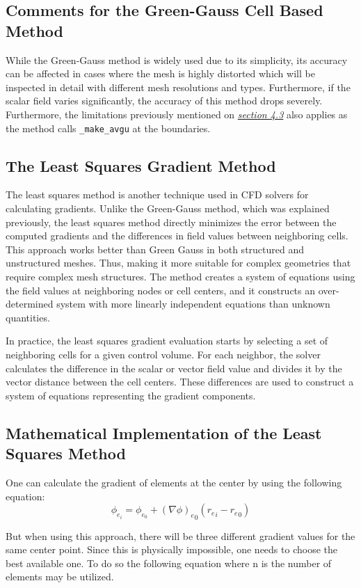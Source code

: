 \documentclass[a4paper, 12pt]{article}
\begin{document}
\subsection{Comments for the Green-Gauss Cell Based Method}
While the Green-Gauss method is widely used due to its simplicity, its accuracy can be affected in cases where the mesh is highly distorted which will be inspected in detail with different mesh resolutions and types. Furthermore, if the scalar field varies significantly, the accuracy of this method drops severely. Furthermore, the limitations previously mentioned on \hyperref[probavgudelu]{\textit{section 4.3}} also applies as the method calls \verb|_make_avgu| at the boundaries.

\subsection{The Least Squares Gradient Method}
The least squares method is another technique used in CFD solvers for calculating gradients. Unlike the Green-Gauss method, which was explained previously, the least squares method directly minimizes the error between the computed gradients and the differences in field values between neighboring cells. This approach works better than Green Gauss in both structured and unstructured meshes. Thus, making it more suitable for complex geometries that require complex mesh structures. The method creates a system of equations using the field values at neighboring nodes or cell centers, and it constructs an over-determined system with more linearly independent equations than unknown quantities.
\\\par
In practice, the least squares gradient evaluation starts by selecting a set of neighboring cells for a given control volume. For each neighbor, the solver calculates the difference in the scalar or vector field value and divides it by the vector distance between the cell centers. These differences are used to construct a system of equations representing the gradient components. 
\subsection{Mathematical Implementation of the Least Squares Method} \label{matlsq}
One can calculate the gradient of elements at the center by using the
following equation:
\begin{equation}
    \phi_{e_{i}} = \phi_{e_{0}} + {(\nabla\phi)_{e}}_{0}({r_{e}}_{i} - {r_{e}}_{0})
\end{equation} \par
But when using this approach, there will be three different gradient
values for the same center point. Since this is physically impossible,
one needs to choose the best available one. To do so the following
equation where n is the number of elements may be utilized.
\end{document}
